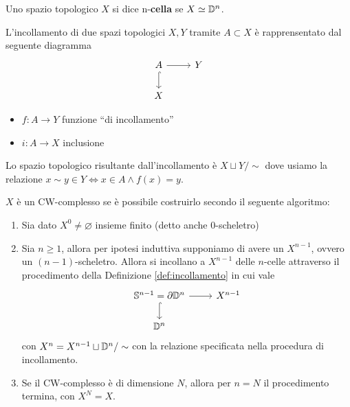 \begin{definition}
	Uno spazio topologico $X$ si dice n-\textbf{cella} se $X \simeq \mathbb{D}^n$.
\end{definition}

\begin{definition}
	\label{def:incollamento}
	L'incollamento di due spazi topologici $X,Y$ tramite $A \subset X$ è rapprensentato dal seguente diagramma
	\begin{equation*}
	\begin{tikzcd}
	A \arrow[d, hook]{i} \arrow[r]{f} & Y \\
	X
	\end{tikzcd}
	\end{equation*} 
	\begin{itemize}
		\item $f: A \to Y$ funzione \enquote{di incollamento}
		\item $i: A \to X$ inclusione
	\end{itemize}
	Lo spazio topologico risultante dall'incollamento è $X \sqcup Y / \sim$ dove usiamo la relazione $x \sim y \in Y \Longleftrightarrow x \in A \land f(x) = y$.
\end{definition}

\begin{remark}
	$X$ è un CW-complesso se è possibile costruirlo secondo il seguente algoritmo:
	\begin{enumerate}
		\item Sia dato $X^0 \neq \varnothing$ insieme finito (detto anche $0$-scheletro)
		\item Sia $n \ge 1$, allora per ipotesi induttiva supponiamo di avere un $X^{n-1}$, ovvero un $(n-1)$-scheletro. Allora si incollano a $X^{n-1}$ delle $n$-celle attraverso il procedimento della Definizione \ref{def:incollamento} in cui vale 
		\begin{equation*}
		\begin{tikzcd}
			\S^{n-1} = \partial \D^n \arrow[d, hook]{i} \arrow[r]{f} & X^{n-1} \\
			\D^n
		\end{tikzcd}
		\end{equation*} 
		con $X^n = X^{n-1} \sqcup \mathbb{D}^n / \sim$ con la relazione specificata nella procedura di incollamento.
		\item Se il CW-complesso è di dimensione $N$, allora per $n = N$ il procedimento termina, con $X^N = X$.  
	\end{enumerate}
\end{remark}

